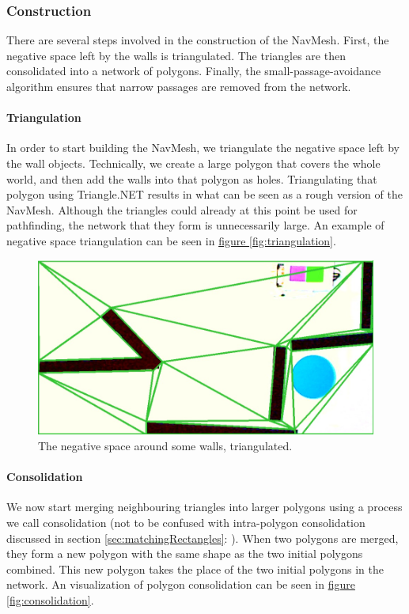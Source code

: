 \documentclass[10pt, abstracton, twocolumn]{scrartcl}
\newcommand{\fref}[1]{\hyperref[#1]{figure \vref{#1}}}
\newcommand{\sref}[1]{section \vref{#1}: \nameref{#1}}
\begin{document}
\subsubsection{Construction}
There are several steps involved in the construction of the NavMesh. First, the negative space left by the walls is triangulated. The triangles are then consolidated into a network of polygons. Finally, the small-passage-avoidance algorithm ensures that narrow passages are removed from the network.

\paragraph{Triangulation}
In order to start building the NavMesh, we triangulate the negative space left by the wall objects. Technically, we create a large polygon that covers the whole world, and then add the walls into that polygon as holes. Triangulating that polygon using Triangle.NET results in what can be seen as a rough version of the NavMesh. Although the triangles could already at this point be used for pathfinding, the network that they form is unnecessarily large. An example of negative space triangulation can be seen in \fref{fig:triangulation}.

\begin{figure}
        \centering
        \includegraphics[width=\columnwidth]{pictures/triangulation.png}
        \caption{\small The negative space around some walls, triangulated.}
        \label{fig:triangulation}
\end{figure}

\paragraph{Consolidation}
We now start merging neighbouring triangles into larger polygons using a process we call consolidation (not to be confused with intra-polygon consolidation discussed in \sref{sec:matchingRectangles}). When two polygons are merged, they form a new polygon with the same shape as the two initial polygons combined. This new polygon takes the place of the two initial polygons in the network. An visualization of polygon consolidation can be seen in \fref{fig:consolidation}.
\end{document}
